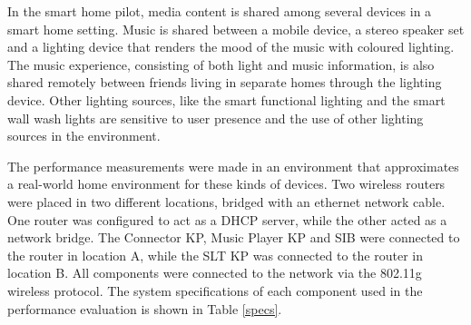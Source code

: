 

In the smart home pilot, media content is shared among several devices in a smart home setting. Music is shared between a mobile device, a stereo speaker set and a lighting device that renders the mood of the music with coloured lighting. The music experience, consisting of both light and music information, is also shared remotely between friends living in separate homes through the lighting device. Other lighting sources, like the smart functional lighting and the smart wall wash lights are sensitive to user presence and the use of other lighting sources in the environment.

The performance measurements were made in an environment that approximates a real-world home environment for these kinds of devices. Two wireless routers were placed in two different locations, bridged with an ethernet network cable. One router was configured to act as a DHCP server, while the other acted as a network bridge. The Connector \ac{KP}, Music Player \ac{KP} and \ac{SIB} were connected to the router in location A, while the \ac{SLT} KP was connected to the router in location B. All components were connected to the network via the 802.11g wireless protocol. The system specifications of each component used in the performance evaluation is shown in Table \ref{specs}.


